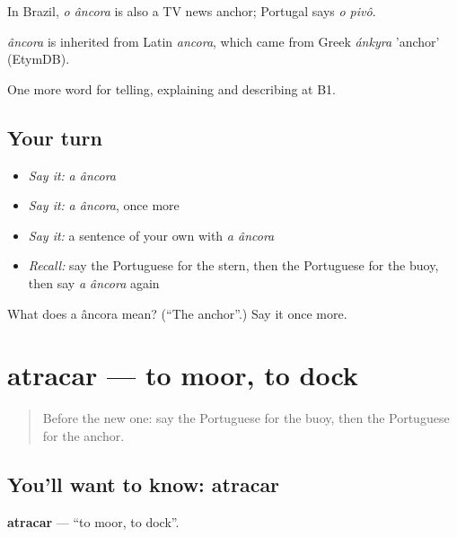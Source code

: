 In Brazil, \emph{o âncora} is also a TV news anchor; Portugal says \emph{o pivô}.

\begin{cousinweb}
\emph{âncora} is inherited from Latin \emph{ancora}, which came from Greek \emph{ánkyra} 'anchor' (EtymDB).
\end{cousinweb}

\begin{grammarlens}[title={What you've built}]
One more word for telling, explaining and describing at B1.
\end{grammarlens}

\subsection*{Your turn}
\begin{itemize}
\raggedright
  \item \emph{Say it:} \emph{a âncora}
  \item \emph{Say it:} \emph{a âncora}, once more
  \item \emph{Say it:} a sentence of your own with \emph{a âncora}
  \item \emph{Recall:} say the Portuguese for the stern, then the Portuguese for the buoy, then say \emph{a âncora} again
\end{itemize}

\begin{tcolorbox}[breakable,colback=teal!4,colframe=teal!35!black,title={Before you move on}]
What does a âncora mean? (\textquotedblleft{}The anchor\textquotedblright{}.) Say it once more.
\end{tcolorbox}
\section[atracar]{atracar — to moor, to dock}

\label{lesson:PT-C420-atracar}



\begin{quote}
Before the new one: say the Portuguese for the buoy, then the Portuguese for the anchor.
\end{quote}

\subsection*{You'll want to know: atracar}
\textbf{atracar} — \textquotedblleft{}to moor, to dock\textquotedblright{}.

